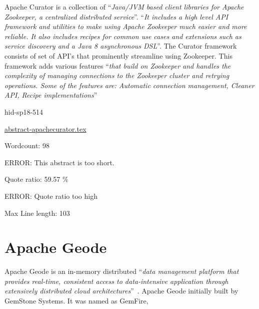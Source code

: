 Apache Curator is a collection of \color{blue}``\emph{Java/JVM based client libraries for
Apache Zookeeper, a centralized distributed
service}''\color{black}\cite{hid-sp18-514-apachecurator}.  \color{blue}``\emph{It includes a high level
API framework and utilities to make using Apache Zookeeper much easier
and more reliable.  It also includes recipes for common use cases and
extensions such as service discovery and a Java 8 asynchronous
DSL}''\color{black}\cite{hid-sp18-514-apachecurator}.  The Curator framework consists
of set of API’s that prominently streamline using Zookeeper.  This
framework adds various features \color{blue}``\emph{that build on Zookeeper and handles
the complexity of managing connections to the Zookeeper cluster and
retrying operations.  Some of the features are: Automatic connection
management, Cleaner API, Recipe
implementations}''\color{black}\cite{hid-sp18-514-apachecuratorfeatures}


\begin{IU}

hid-sp18-514

\href{https://github.com/cloudmesh-community/hid-sp18-514/blob/master//technology/abstract-apachecurator.tex}{abstract-apachecurator.tex}

 

Wordcount: 98

ERROR: This abstract is too short.


Quote ratio: 59.57 \%

ERROR: Quote ratio too high
 
Max Line length: 103
\end{IU}

\section{Apache Geode}

Apache Geode is an in-memory distributed \color{blue}``\emph{data management platform
that provides real-time, consistent access to data-intensive
application through extensively distributed cloud
architectures}''\color{black}~\cite{hid-sp18-514-apachegeodewiki}. Apache Geode
initially built by GemStone Systems. It was named as GemFire, 

